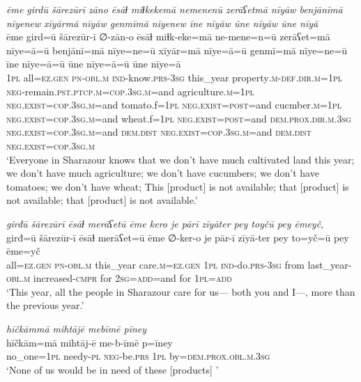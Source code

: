 \ea \label{PM.37}
\textit{ēme girdū šārezūrī zāno ēsāɫ miɫkekemā nemenenū zerāʕetmā nīyāw benjānīmā nīyenew xīyārmā nīyāw genmīmā nīyenew īne nīyāw ūne nīyāw ūne nīyā} \\ 
\gll ēme gird=ū šārezūr-ī ∅-zān-o ēsāɫ miɫk-eke=mā ne-mene=n=ū zerāʕet=mā nīye=ā=ū benjānī=mā nīye=ne=ū xīyār=mā nīye=ā=ū genmī=mā nīye=ne=ū īne nīye=ā=ū ūne nīye=ā=ū ūne nīye=ā \\ 
 \textsc{1pl} all\textsc{\textsc{=ez.gen}} \textsc{pn}\textsc{-obl}\textsc{.m} \textsc{ind-}know\textsc{.prs}\textsc{-3sg} this\_year property\textsc{.m}\textsc{-def}\textsc{.dir}\textsc{.m}\textsc{=1pl} \textsc{neg-}remain\textsc{.pst}\textsc{.ptcp}\textsc{.m}\textsc{=cop}\textsc{.3sg}\textsc{.m}=and agriculture\textsc{.m}\textsc{=1pl} \textsc{\textsc{neg.}exist}\textsc{=cop}\textsc{.3sg}\textsc{.m}=and tomato.f\textsc{=1pl} \textsc{\textsc{neg.}exist}\textsc{=\textsc{post}}=and cucmber\textsc{.m}\textsc{=1pl} \textsc{\textsc{neg.}exist}\textsc{=cop}\textsc{.3sg}\textsc{.m}=and wheat.f\textsc{=1pl} \textsc{\textsc{neg.}exist}\textsc{=\textsc{post}}=and \textsc{dem.prox}\textsc{.dir}\textsc{.m}\textsc{.3sg} \textsc{\textsc{neg.}exist}\textsc{=cop}\textsc{.3sg}\textsc{.m}=and \textsc{dem.dist} \textsc{\textsc{neg.}exist}\textsc{=cop}\textsc{.3sg}\textsc{.m}=and \textsc{dem.dist} \textsc{\textsc{neg.}exist}\textsc{=cop}\textsc{.3sg}\textsc{.m} \\ 
\glt `Everyone in Sharazour knows that we don’t have much cultivated land this year; we don’t have much agriculture; we don’t have cucumbers; we don’t have tomatoes; we don’t have wheat; This [product] is not available; that [product] is not available; that [product] is not available.'
\z 
 
\ea \label{PM.38}
\textit{girđū šārezūrī ēsāɫ merāʕetū ēme kero je pārī zīyāter pey toyčū pey ēmeyč,} \\ 
\gll girđ=ū šārezūr-ī ēsāɫ merāʕet=ū ēme ∅-ker-o je pār-ī zīyā-ter pey to=yč=ū pey ēme=yč \\ 
 all\textsc{\textsc{=ez.gen}} \textsc{pn}\textsc{-obl}\textsc{.m} this\_year care\textsc{.m}\textsc{\textsc{=ez.gen}} \textsc{1pl} \textsc{ind-}do\textsc{.prs}\textsc{-3sg} from last\_year\textsc{-obl}\textsc{.m} increased\textsc{-cmpr} for \textsc{2sg}\textsc{=add}=and for \textsc{1pl}\textsc{=add} \\ 
\glt `This year, all the people in Sharazour care for us— both you and I—, more than the previous year.'
\z 
 
\ea \label{PM.39}
\textit{hīčkāmmā mihtājē mebīmē pīney} \\ 
\gll hīčkām=mā mihtāj-ē me-b-īmē p=īney \\ 
 no\_one\textsc{=1pl} needy\textsc{\textsc{-pl}} \textsc{neg-}be\textsc{.prs} \textsc{1pl} by=\textsc{dem.prox}\textsc{.obl}\textsc{.m}\textsc{.3sg} \\ 
\glt `None of us would be in need of these [products] '
\z 
 

